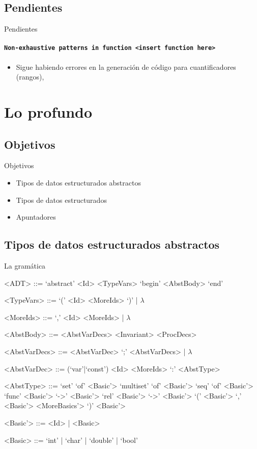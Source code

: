 \documentclass{beamer}
\begin{document}
\subsection{Pendientes}
\begin{frame}{Pendientes}
\framesubtitle{\texttt{Non-exhaustive patterns in function <insert function here>}}
\begin{itemize}
  \item Sigue habiendo errores en la generación de código para cuantificadores (rangos),
\end{itemize}
\end{frame}


\section{Lo profundo}
\subsection{Objetivos}
\begin{frame}{Objetivos}
\begin{itemize}
  \item Tipos de datos estructurados abstractos
  \item Tipos de datos estructurados
  \item Apuntadores
\end{itemize}
\end{frame}


\subsection{Tipos de datos estructurados abstractos}
\begin{frame}[fragile]{La gramática}
\scriptsize
\begin{grammar}

<ADT> ::= `abstract' <Id> <TypeVars> `begin' <AbstBody> `end'

<TypeVars> ::= `(' <Id> <MoreIds> `)' | $\lambda$

<MoreIds> ::= `,' <Id> <MoreIds> | $\lambda$

<AbstBody> ::= <AbstVarDecs> <Invariant> <ProcDecs>

<AbstVarDecs> ::= <AbstVarDec> `;' <AbstVarDecs> | $\lambda$

<AbstVarDec> ::= (`var'|`const') <Id> <MoreIds> `:' <AbstType>

<AbstType> ::= `set' `of' <Basic'>
\alt `multiset' `of' <Basic'>
\alt `seq' `of' <Basic'>
\alt `func' <Basic'> `->' <Basic'>
\alt `rel' <Basic'> `->' <Basic'>
\alt `(' <Basic'> `,' <Basic'> <MoreBasics'> `)'
\alt <Basic'>

<Basic'> ::= <Id> | <Basic>

<Basic> ::= `int' | `char' | `double' | `bool'

\end{grammar}
\end{frame}
\end{document}

